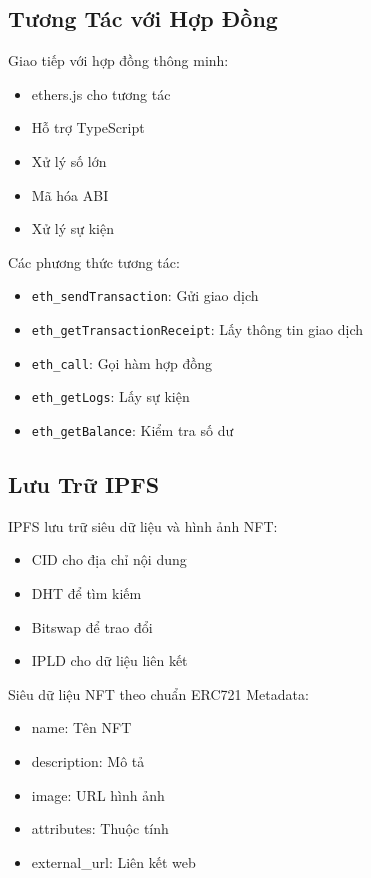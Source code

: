\subsection{Tương Tác với Hợp Đồng}
Giao tiếp với hợp đồng thông minh:
\begin{itemize}
    \item ethers.js cho tương tác
    \item Hỗ trợ TypeScript
    \item Xử lý số lớn
    \item Mã hóa ABI
    \item Xử lý sự kiện
\end{itemize}
Các phương thức tương tác:
\begin{itemize}
    \item \texttt{eth\_sendTransaction}: Gửi giao dịch
    \item \texttt{eth\_getTransactionReceipt}: Lấy thông tin giao dịch
    \item \texttt{eth\_call}: Gọi hàm hợp đồng
    \item \texttt{eth\_getLogs}: Lấy sự kiện
    \item \texttt{eth\_getBalance}: Kiểm tra số dư
\end{itemize}

\subsection{Lưu Trữ IPFS}
IPFS lưu trữ siêu dữ liệu và hình ảnh NFT:
\begin{itemize}
    \item CID cho địa chỉ nội dung
    \item DHT để tìm kiếm
    \item Bitswap để trao đổi
    \item IPLD cho dữ liệu liên kết
\end{itemize}
Siêu dữ liệu NFT theo chuẩn ERC721 Metadata:
\begin{itemize}
    \item name: Tên NFT
    \item description: Mô tả
    \item image: URL hình ảnh
    \item attributes: Thuộc tính
    \item external\_url: Liên kết web
\end{itemize}